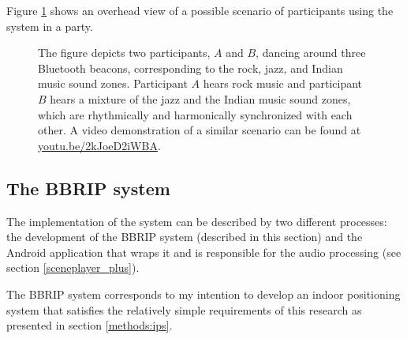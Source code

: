 \documentclass[a4paper,11pt]{article}
\begin{document}
Figure \ref{fig:sys:participant_view} shows an overhead view of a possible scenario of participants using the system in a party.

\begin{figure}[!htb]
	\centering
	\def\svgwidth{0.9\textwidth}
	
	\caption{The figure depicts two participants, $A$ and $B$, dancing around three Bluetooth beacons, corresponding to the rock, jazz, and Indian music sound zones. Participant $A$ hears rock music and participant $B$ hears a mixture of the jazz and the Indian music sound zones, which are rhythmically and harmonically synchronized with each other. A video demonstration of a similar scenario can be found at \href{http://youtu.be/2kJoeD2iWBA}{youtu.be/2kJoeD2iWBA}.}\label{fig:sys:participant_view}
\end{figure}

\subsection{The BBRIP system}

The implementation of the system can be described by two different processes: the development of the BBRIP system (described in this section) and the Android application that wraps it and is responsible for the audio processing (see section \ref{sceneplayer_plus}).

The BBRIP system corresponds to my intention to develop an indoor positioning system that satisfies the relatively simple requirements of this research as presented in section \ref{methods:ips}.
\end{document}
